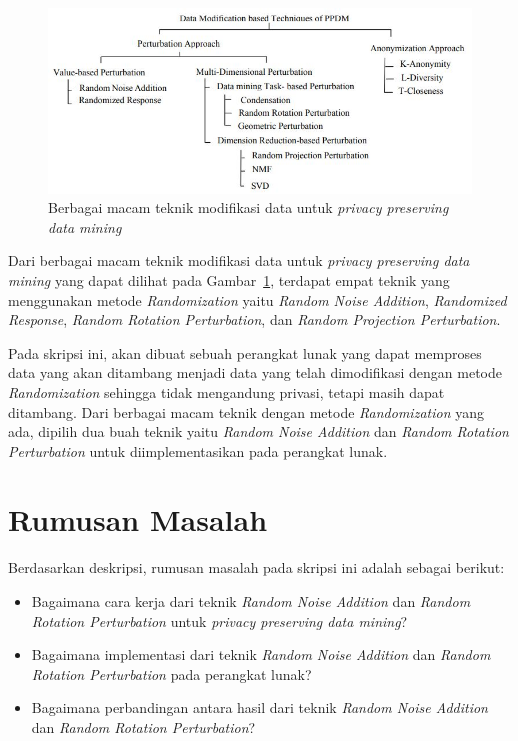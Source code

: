 \documentclass[a4paper,twoside]{article}
\begin{document}
\begin{figure}
	\centering
	\includegraphics[scale=0.785]{ppdm}
	\caption{Berbagai macam teknik modifikasi data untuk \textit{privacy preserving data mining}}
	\label{fig:ppdm}
\end{figure}

Dari berbagai macam teknik modifikasi data untuk \textit{privacy preserving data mining} yang dapat dilihat pada Gambar~\ref{fig:ppdm}, terdapat empat teknik yang menggunakan metode \textit{Randomization} yaitu \textit{Random Noise Addition}, \textit{Randomized Response}, \textit{Random Rotation Perturbation}, dan \textit{Random Projection Perturbation}.

Pada skripsi ini, akan dibuat sebuah perangkat lunak yang dapat memproses data yang akan ditambang menjadi data yang telah dimodifikasi dengan metode \textit{Randomization} sehingga tidak mengandung privasi, tetapi masih dapat ditambang. Dari berbagai macam teknik dengan metode \textit{Randomization} yang ada, dipilih dua buah teknik yaitu \textit{Random Noise Addition} dan \textit{Random Rotation Perturbation} untuk diimplementasikan pada perangkat lunak.

\section{Rumusan Masalah}
Berdasarkan deskripsi, rumusan masalah pada skripsi ini adalah sebagai berikut:
\begin{itemize}
	\item Bagaimana cara kerja dari teknik \textit{Random Noise Addition} dan \textit{Random Rotation Perturbation} untuk \textit{privacy preserving data mining}?
	\item Bagaimana implementasi dari teknik \textit{Random Noise Addition} dan \textit{Random Rotation Perturbation} pada perangkat lunak?
	\item Bagaimana perbandingan antara hasil dari teknik \textit{Random Noise Addition} dan \textit{Random Rotation Perturbation}?
\end{itemize}
\end{document}
